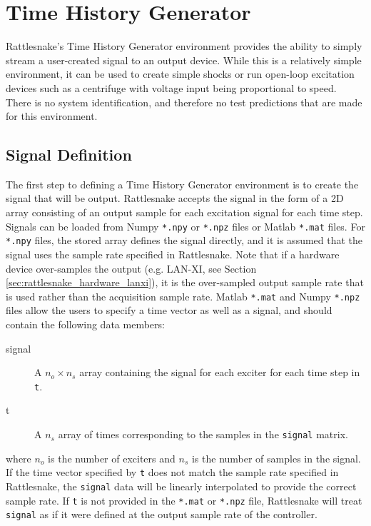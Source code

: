 \documentclass[pdf,12pt,report]{SANDreport}
\newcommand{\inlineCode}{\lstinline[basicstyle=\bfseries\ttfamily]}
\begin{document}
    \chapter{Time History Generator}\label{sec:rattlesnake_environments_time_generator}
    
    Rattlesnake's Time History Generator environment provides the ability to simply stream a user-created signal to an output device.  While this is a relatively simple environment, it can be used to create simple shocks or run open-loop excitation devices such as a centrifuge with voltage input being proportional to speed.  There is no system identification, and therefore no test predictions that are made for this environment.
    
    \section{Signal Definition}
    
    The first step to defining a Time History Generator environment is to create the signal that will be output.  Rattlesnake accepts the signal in the form of a 2D array consisting of an output sample for each excitation signal for each time step.  Signals can be loaded from Numpy \inlineCode{*.npy} or \inlineCode{*.npz} files or Matlab \inlineCode{*.mat} files.  For \inlineCode{*.npy} files, the stored array defines the signal directly, and it is assumed that the signal uses the sample rate specified in Rattlesnake.  Note that if a hardware device over-samples the output (e.g. LAN-XI, see Section \ref{sec:rattlesnake_hardware_lanxi}), it is the over-sampled output sample rate that is used rather than the acquisition sample rate.  Matlab \inlineCode{*.mat} and Numpy \inlineCode{*.npz} files allow the users to specify a time vector as well as a signal, and should contain the following data members:
    \begin{description}
        \item[signal] A $n_o \times n_s$ array containing the signal for each exciter for each time step in \inlineCode{t}.
        \item[t] A $n_s$ array of times corresponding to the samples in the \inlineCode{signal} matrix.
    \end{description}
    where $n_o$ is the number of exciters and $n_s$ is the number of samples in the signal.  If the time vector specified by \inlineCode{t} does not match the sample rate specified in Rattlesnake, the \inlineCode{signal} data will be linearly interpolated to provide the correct sample rate.  If \inlineCode{t} is not provided in the \inlineCode{*.mat} or \inlineCode{*.npz} file, Rattlesnake will treat \inlineCode{signal} as if it were defined at the output sample rate of the controller.
    
\end{document}

